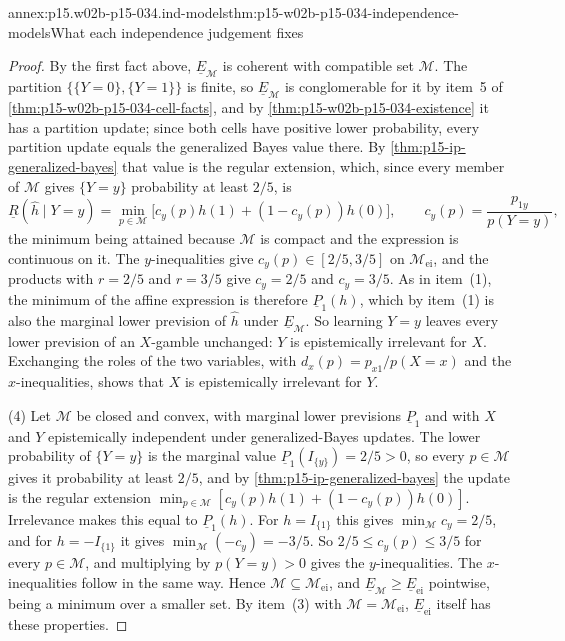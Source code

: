 \begin{annexitem}{annex:p15.w02b-p15-034.ind-models}{thm:p15-w02b-p15-034-independence-models}{What each independence judgement fixes}
\begin{proof}
By the first fact above, \(\underline E_{\mathcal M}\) is coherent with
compatible set \(\mathcal M\). The partition \(\{\{Y=0\},\{Y=1\}\}\) is
finite, so \(\underline E_{\mathcal M}\) is conglomerable for it by item~5
of \cref{thm:p15-w02b-p15-034-cell-facts}, and by
\cref{thm:p15-w02b-p15-034-existence} it has a partition update; since both
cells have positive lower probability, every partition update equals the
generalized Bayes value there. By \cref{thm:p15-ip-generalized-bayes} that
value is the regular extension, which, since every member of \(\mathcal M\)
gives \(\{Y=y\}\) probability at least \(2/5\), is
\[
 \underline R(\hat h\mid Y{=}y)=\min_{p\in\mathcal M}
 \bigl[c_y(p)h(1)+(1-c_y(p))h(0)\bigr],\qquad
 c_y(p)=\frac{p_{1y}}{p(Y{=}y)},
\]
the minimum being attained because \(\mathcal M\) is compact and the
expression is continuous on it. The \(y\)-inequalities give
\(c_y(p)\in[2/5,3/5]\) on \(\mathcal M_{\mathrm{ei}}\), and the products
with \(r=2/5\) and \(r=3/5\) give \(c_y=2/5\) and \(c_y=3/5\). As in
item~(1), the minimum of the affine expression is therefore
\(\underline P_1(h)\), which by item~(1) is also the marginal lower
prevision of \(\hat h\) under \(\underline E_{\mathcal M}\). So learning
\(Y=y\) leaves every lower prevision of an \(X\)-gamble unchanged: \(Y\) is
epistemically irrelevant for \(X\). Exchanging the roles of the two
variables, with \(d_x(p)=p_{x1}/p(X{=}x)\) and the \(x\)-inequalities,
shows that \(X\) is epistemically irrelevant for \(Y\).

(4) Let \(\mathcal M\) be closed and convex, with marginal lower previsions
\(\underline P_1\) and with \(X\) and \(Y\) epistemically independent
under generalized-Bayes updates. The lower probability of \(\{Y=y\}\) is
the marginal value \(\underline P_1(I_{\{y\}})=2/5>0\), so every
\(p\in\mathcal M\) gives it probability at least \(2/5\), and by
\cref{thm:p15-ip-generalized-bayes} the update is the regular extension
\(\min_{p\in\mathcal M}[c_y(p)h(1)+(1-c_y(p))h(0)]\). Irrelevance makes this
equal to \(\underline P_1(h)\). For \(h=I_{\{1\}}\) this gives
\(\min_{\mathcal M}c_y=2/5\), and for \(h=-I_{\{1\}}\) it gives
\(\min_{\mathcal M}(-c_y)=-3/5\). So \(2/5\leq c_y(p)\leq3/5\) for every
\(p\in\mathcal M\), and multiplying by \(p(Y{=}y)>0\) gives the
\(y\)-inequalities. The \(x\)-inequalities follow in the same way. Hence
\(\mathcal M\subseteq\mathcal M_{\mathrm{ei}}\), and
\(\underline E_{\mathcal M}\geq\underline E_{\mathrm{ei}}\) pointwise,
being a minimum over a smaller set. By item~(3) with
\(\mathcal M=\mathcal M_{\mathrm{ei}}\), \(\underline E_{\mathrm{ei}}\)
itself has these properties.


\end{proof}
\end{annexitem}
